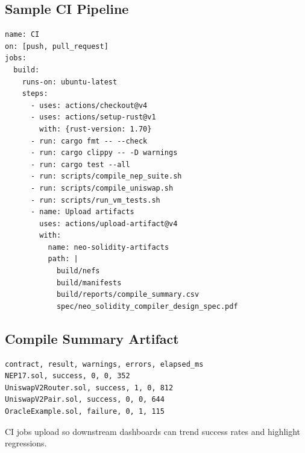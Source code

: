 \documentclass[11pt]{article}
\begin{document}
\subsection{Sample CI Pipeline}
\begin{small}
\begin{verbatim}
name: CI
on: [push, pull_request]
jobs:
  build:
    runs-on: ubuntu-latest
    steps:
      - uses: actions/checkout@v4
      - uses: actions/setup-rust@v1
        with: {rust-version: 1.70}
      - run: cargo fmt -- --check
      - run: cargo clippy -- -D warnings
      - run: cargo test --all
      - run: scripts/compile_nep_suite.sh
      - run: scripts/compile_uniswap.sh
      - run: scripts/run_vm_tests.sh
      - name: Upload artifacts
        uses: actions/upload-artifact@v4
        with:
          name: neo-solidity-artifacts
          path: |
            build/nefs
            build/manifests
            build/reports/compile_summary.csv
            spec/neo_solidity_compiler_design_spec.pdf
\end{verbatim}
\end{small}

\subsection{Compile Summary Artifact}
\begin{small}
\begin{verbatim}
contract, result, warnings, errors, elapsed_ms
NEP17.sol, success, 0, 0, 352
UniswapV2Router.sol, success, 1, 0, 812
UniswapV2Pair.sol, success, 0, 0, 644
OracleExample.sol, failure, 0, 1, 115
\end{verbatim}
\end{small}
\noindent CI jobs upload  so downstream dashboards can trend success rates and highlight regressions.
\end{document}
